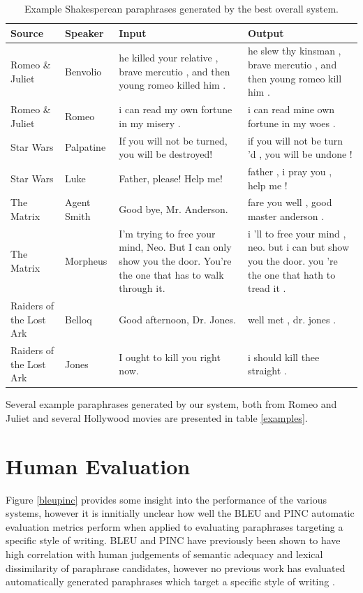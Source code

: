 \documentclass[10pt,a5paper,twoside]{article}
\begin{document}
\begin{table}[ht]
  \begin{center}
    \begin{tabular}{|l|l|p{1.4in}|p{1.4in}|}
      \hline
      Source & Speaker & Input & Output \\
      \hline
      \hline
      Romeo \& Juliet & Benvolio & he killed your relative , brave mercutio , and then young romeo killed him . & he slew thy kinsman , brave mercutio , and then young romeo kill him . \\
      \hline
      Romeo \& Juliet & Romeo & i can read my own fortune in my misery . & i can read mine own fortune in my woes . \\
      \hline
      Star Wars & Palpatine & If you will not be turned, you will be destroyed! & if you will not be turn 'd , you will be undone ! \\
      \hline
      Star Wars & Luke & Father, please! Help me! & father , i pray you , help me ! \\    
      \hline
      The Matrix & Agent Smith & Good bye, Mr. Anderson. & fare you well , good master anderson . \\
      \hline
      The Matrix & Morpheus & I'm trying to free your mind, Neo. But I can only show you the door. You're the one that has to walk through it. & i 'll to free your mind , neo. but i can but show you the door. you 're the one that hath to tread it . \\
      \hline
      Raiders of the Lost Ark & Belloq & Good afternoon, Dr. Jones. & well met , dr. jones . \\
      \hline
      Raiders of the Lost Ark & Jones & I ought to kill you right now. & i should kill thee straight . \\
      \hline
    \end{tabular}
  \end{center}
  \caption{Example Shakesperean paraphrases generated by the best overall system.}
\end{table}

Several example paraphrases generated by our system, both from Romeo and Juliet and several Hollywood movies are presented in table \ref{examples}.

\section{Human Evaluation}
\label{human_evaluation}
Figure \ref{bleupinc} provides some insight into the performance of the various systems, however it is innitially unclear how well the BLEU and PINC
automatic evaluation metrics perform when applied to evaluating paraphrases targeting a specific style of writing.  BLEU and PINC have previously
been shown to have high correlation with human judgements of semantic adequacy and lexical dissimilarity of paraphrase candidates, however no
previous work has evaluated automatically generated paraphrases which target a specific style of writing \cite{chen11}.
\end{document}
